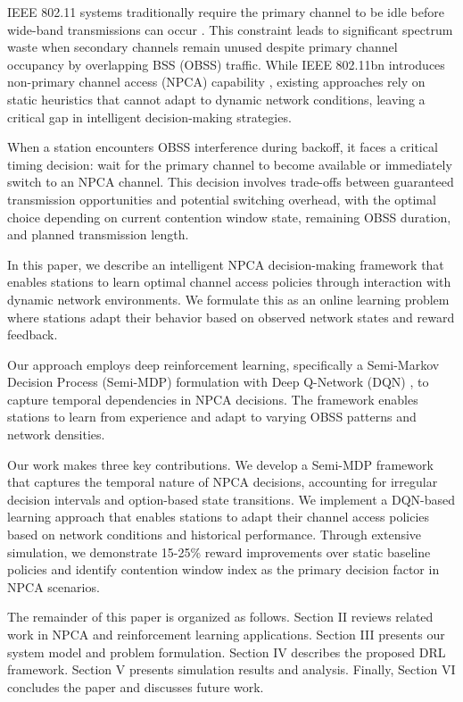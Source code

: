 \documentclass[conference]{IEEEtran}
\begin{document}
IEEE 802.11 systems traditionally require the primary channel to be idle before wide-band transmissions can occur \cite{wei2024non}. This constraint leads to significant spectrum waste when secondary channels remain unused despite primary channel occupancy by overlapping BSS (OBSS) traffic. While IEEE 802.11bn introduces non-primary channel access (NPCA) capability \cite{bellalta2025performance}, existing approaches rely on static heuristics that cannot adapt to dynamic network conditions, leaving a critical gap in intelligent decision-making strategies.

When a station encounters OBSS interference during backoff, it faces a critical timing decision: wait for the primary channel to become available or immediately switch to an NPCA channel. This decision involves trade-offs between guaranteed transmission opportunities and potential switching overhead, with the optimal choice depending on current contention window state, remaining OBSS duration, and planned transmission length. 

In this paper, we describe an intelligent NPCA decision-making framework that enables stations to learn optimal channel access policies through interaction with dynamic network environments. We formulate this as an online learning problem where stations adapt their behavior based on observed network states and reward feedback.

Our approach employs deep reinforcement learning, specifically a Semi-Markov Decision Process (Semi-MDP) formulation with Deep Q-Network (DQN) \cite{mnih2013playing, mnih2015human}, to capture temporal dependencies in NPCA decisions. The framework enables stations to learn from experience and adapt to varying OBSS patterns and network densities.

Our work makes three key contributions. We develop a Semi-MDP framework that captures the temporal nature of NPCA decisions, accounting for irregular decision intervals and option-based state transitions. We implement a DQN-based learning approach that enables stations to adapt their channel access policies based on network conditions and historical performance. Through extensive simulation, we demonstrate 15-25\% reward improvements over static baseline policies and identify contention window index as the primary decision factor in NPCA scenarios.

The remainder of this paper is organized as follows. Section II reviews related work in NPCA and reinforcement learning applications. Section III presents our system model and problem formulation. Section IV describes the proposed DRL framework. Section V presents simulation results and analysis. Finally, Section VI concludes the paper and discusses future work.
\end{document}
